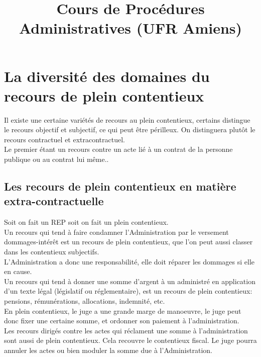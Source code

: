 \documentclass[10pt, a4paper, openany]{book}
\date{}
\title{Cours de Procédures Administratives (UFR Amiens)}
\begin{document}
\maketitle
\tableofcontents

\section{La diversité des domaines du recours de plein contentieux}

Il existe une certaine variétés de recours au plein contentieux, certains distingue le recours objectif et subjectif, ce qui peut être périlleux. On distinguera plutôt le recours contractuel et extracontractuel. \\
Le premier étant un recours contre un acte lié à un contrat de la personne publique ou au contrat lui même.. 

\subsection{Les recours de plein contentieux en matière extra-contractuelle}

Soit on fait un REP soit on fait un plein contentieux. \\
Un recours qui tend à faire condamner l'Administration par le versement dommages-intérêt est un recours de plein contentieux, que l'on peut aussi classer dans les contentieux subjectifs. \\
L'Administration a donc une responsabilité, elle doit réparer les dommages si elle en cause. \\
Un recours qui tend à donner une somme d'argent à un administré en application d'un texte légal (législatif ou réglementaire), est un recours de plein contentieux: pensions, rémunérations, allocations, indemnité, etc. \\
En plein contentieux, le juge a une grande marge de manoeuvre, le juge peut donc fixer une certaine somme, et ordonner son paiement à l'administration. \\
Les recours dirigés contre les actes qui réclament une somme à l'administration sont aussi de plein contentieux. Cela recouvre le contentieux fiscal. Le juge pourra annuler les actes ou bien moduler la somme due à l'Administration.
\end{document}
